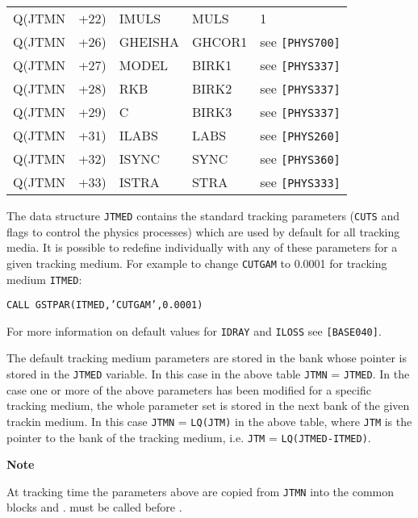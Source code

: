 \begin{center}
\begin{tabular}{|>{\ttfamily}r@{}>{\ttfamily}r@{\quad=\quad}>{\ttfamily}l|>{\ttfamily}l|l|}
Q(JTMN & +22)& IMULS  &  MULS  & 1        \\
Q(JTMN & +26)& GHEISHA   & GHCOR1 & see \texttt{[PHYS700]}  \\
Q(JTMN & +27)& MODEL     & BIRK1  & see \texttt{[PHYS337]}  \\
Q(JTMN & +28)& RKB     & BIRK2  & see \texttt{[PHYS337]}  \\
Q(JTMN & +29)& C     & BIRK3  & see \texttt{[PHYS337]}  \\
Q(JTMN & +31)& ILABS  & LABS  & see \texttt{[PHYS260]}  \\
Q(JTMN & +32)& ISYNC  & SYNC  & see \texttt{[PHYS360]}  \\
Q(JTMN & +33)& ISTRA  & STRA  & see \texttt{[PHYS333]} \\
\hline
\end{tabular}
\end{center} 
 
The data structure \texttt{JTMED} contains the standard tracking parameters
(\texttt{CUTS} and flags to control the physics processes) which are used by
default for all tracking media. It is possible to redefine individually
with  any of these parameters for a given tracking medium.
For example to change \texttt{CUTGAM} to 0.0001 for tracking medium \texttt{ITMED}:
\begin{center}
 \texttt{CALL GSTPAR(ITMED,'CUTGAM',0.0001)}
\end{center}

For more information on default values for \texttt{IDRAY} and \texttt{ILOSS} see
\texttt{[BASE040]}.
 
The default tracking medium parameters are stored in the bank whose
pointer is stored in the \texttt{JTMED} variable. In this case in the
above table \texttt{JTMN} = \texttt{JTMED}. In the case one or more of
the above parameters has been modified for a specific tracking
medium, the whole parameter set is stored in the next bank of the
given trackin medium. In this case \texttt{JTMN} = \texttt{LQ(JTM)} in
the above table, where \texttt{JTM} is the pointer to the bank of the
tracking medium, i.e. \texttt{JTM} = \texttt{LQ(JTMED-ITMED)}.
 
{\bf Note}
 
At tracking time the parameters above are copied
from \texttt{JTMN} into the common blocks
 and .  must be called before
.
%
 
